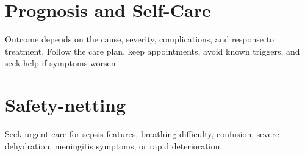 \section*{Prognosis and Self-Care}
Outcome depends on the cause, severity, complications, and response to treatment. Follow the care plan, keep appointments, avoid known triggers, and seek help if symptoms worsen.
\section*{Safety-netting}
Seek urgent care for sepsis features, breathing difficulty, confusion, severe dehydration, meningitis symptoms, or rapid deterioration.
